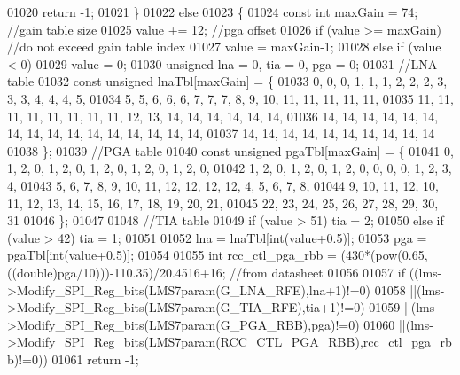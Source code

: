 \begin{DoxyCode}
{{{01020             \textcolor{keywordflow}{return} -1;
01021     \}
01022     \textcolor{keywordflow}{else}
01023     \{
01024         \textcolor{keyword}{const} \textcolor{keywordtype}{int} maxGain = 74; \textcolor{comment}{//gain table size}
01025         value += 12;           \textcolor{comment}{//pga offset}
01026         \textcolor{keywordflow}{if} (value >= maxGain) \textcolor{comment}{//do not exceed gain table index}
01027             value = maxGain-1;
01028         \textcolor{keywordflow}{else} \textcolor{keywordflow}{if} (value < 0)
01029             value = 0;
01030         \textcolor{keywordtype}{unsigned} lna = 0, tia = 0, pga = 0;
01031         \textcolor{comment}{//LNA table}
01032         \textcolor{keyword}{const} \textcolor{keywordtype}{unsigned} lnaTbl[maxGain] = \{
01033             0,  0,  0,  1,  1,  1,  2,  2,  2,  3,  3,  3,  4,  4,  4,  5,
01034             5,  5,  6,  6,  6,  7,  7,  7,  8,  9,  10, 11, 11, 11, 11, 11,
01035             11, 11, 11, 11, 11, 11, 11, 11, 12, 13, 14, 14, 14, 14, 14, 14,
01036             14, 14, 14, 14, 14, 14, 14, 14, 14, 14, 14, 14, 14, 14, 14, 14,
01037             14, 14, 14, 14, 14, 14, 14, 14, 14, 14
01038         \};
01039         \textcolor{comment}{//PGA table}
01040         \textcolor{keyword}{const} \textcolor{keywordtype}{unsigned} pgaTbl[maxGain] = \{
01041             0,  1,  2,  0,  1,  2,  0,  1,  2,  0,  1,  2,  0,  1,  2,  0,
01042             1,  2,  0,  1,  2,  0,  1,  2,  0,  0,  0,  0,  1,  2,  3,  4,
01043             5,  6,  7,  8,  9,  10, 11, 12, 12, 12, 12, 4,  5,  6,  7,  8,
01044             9,  10, 11, 12, 10, 11, 12, 13, 14, 15, 16, 17, 18, 19, 20, 21,
01045             22, 23, 24, 25, 26, 27, 28, 29, 30, 31
01046         \};
01047 
01048         \textcolor{comment}{//TIA table}
01049         \textcolor{keywordflow}{if} (value > 51) tia = 2;
01050         \textcolor{keywordflow}{else} \textcolor{keywordflow}{if} (value > 42) tia = 1;
01051 
01052         lna = lnaTbl[int(value+0.5)];
01053         pga = pgaTbl[int(value+0.5)];
01054 
01055         \textcolor{keywordtype}{int} rcc\_ctl\_pga\_rbb = (430*(pow(0.65,((\textcolor{keywordtype}{double})pga/10)))-110.35)/20.4516+16; \textcolor{comment}{//from datasheet}
01056 
01057         \textcolor{keywordflow}{if} ((lms->Modify_SPI_Reg_bits(LMS7param(G_LNA_RFE),lna+1)!=0)
01058           ||(lms->Modify_SPI_Reg_bits(LMS7param(G_TIA_RFE),tia+1)!=0)
01059           ||(lms->Modify_SPI_Reg_bits(LMS7param(G_PGA_RBB),pga)!=0)
01060           ||(lms->Modify_SPI_Reg_bits(LMS7param(RCC_CTL_PGA_RBB),rcc\_ctl\_pga\_rbb)!=0))
01061             \textcolor{keywordflow}{return} -1;
}}}
\end{DoxyCode}
